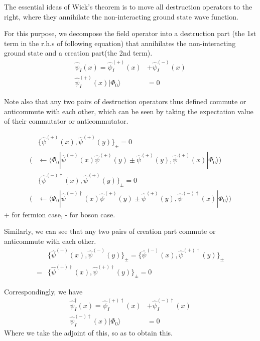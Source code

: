 The essential ideas of Wick's theorem is to move all destruction operators to the right, where they annihilate the non-interacting ground state wave function.

For this purpose, we decompose the field operator into a destruction part (the 1st term in the r.h.s of following equation) that annihilates the non-interacting ground state and a creation part(the 2nd term).
\begin{align}
\hat \psi_{I}(x)=\hat \psi^{(+)}_{I}(x)&+\hat \psi^{(-)}_{I}(x) \nonumber \\
\hat \psi^{(+)}_{I}(x)|\Phi_0\rangle&=0 \nonumber
\end{align}

Note also that any two pairs of destruction operators thus defined commute or anticommute with each other, which can be seen by taking the expectation value of their commutator or anticommutator.

\begin{align}
&\{\hat \psi^{(+)}(x),\hat \psi^{(+)}(y)\}_{\pm}=0 \nonumber \\
\big (&\leftarrow\langle\Phi_0|\hat \psi^{(+)}(x)\hat \psi^{(+)}(y)\pm\hat \psi^{(+)}(y),\hat \psi^{(+)}(x)|\Phi_0\rangle \big) \nonumber \\
&\{\hat \psi^{(-)\dagger}(x),\hat \psi^{(+)}(y)\}_{\pm}=0 \nonumber \\
\big (&\leftarrow\langle\Phi_0|\hat \psi^{(-)\dagger}(x)\hat \psi^{(+)}(y)\pm\hat \psi^{(+)}(y),\hat \psi^{(-)\dagger}(x)|\Phi_0\rangle \big) \nonumber
\end{align} 
+ for fermion case, - for boson case.

Similarly, we can see that any two pairs of creation part commute or anticommute with each other.
\begin{align}
&\{\hat \psi^{(-)}(x),\hat \psi^{(-)}(y)\}_{\pm}=\{\hat \psi^{(-)}(x),\hat \psi^{(+)\dagger}(y)\}_{\pm} \nonumber \\
=&\{\hat \psi^{(+)\dagger}(x),\hat \psi^{(+)\dagger}(y)\}_{\pm}=0 \nonumber 
\end{align}

Correspondingly, we have
\begin{align}
\hat \psi^{\dagger}_{I}(x)=\hat \psi^{(+)\dagger}_{I}(x)&+\hat \psi^{(-)\dagger}_{I}(x) \nonumber \\
\hat \psi^{(-)\dagger}_{I}(x)|\Phi_0\rangle&=0 \nonumber
\end{align}
Where we take the adjoint of this, so as to obtain this.

